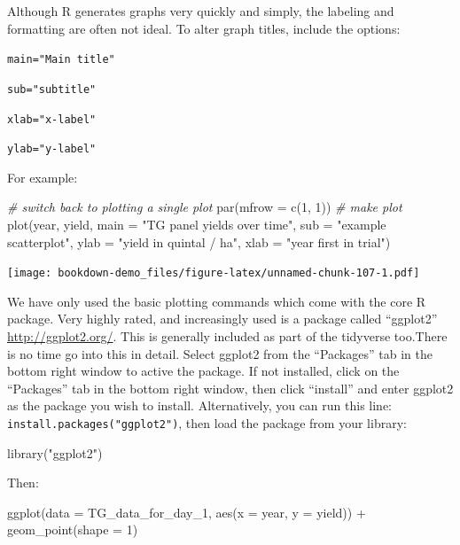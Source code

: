 \documentclass[
]{book}
\newenvironment{Shaded}{\begin{snugshade}}{\end{snugshade}}
\newcommand{\AttributeTok}[1]{\textcolor[rgb]{0.77,0.63,0.00}{#1}}
\newcommand{\CommentTok}[1]{\textcolor[rgb]{0.56,0.35,0.01}{\textit{#1}}}
\newcommand{\DecValTok}[1]{\textcolor[rgb]{0.00,0.00,0.81}{#1}}
\newcommand{\FunctionTok}[1]{\textcolor[rgb]{0.00,0.00,0.00}{#1}}
\newcommand{\NormalTok}[1]{#1}
\newcommand{\SpecialCharTok}[1]{\textcolor[rgb]{0.00,0.00,0.00}{#1}}
\newcommand{\StringTok}[1]{\textcolor[rgb]{0.31,0.60,0.02}{#1}}
\begin{document}
Although R generates graphs very quickly and simply, the labeling and formatting are often not ideal. To alter graph titles, include the options:

\texttt{main="Main\ title"}

\texttt{sub="subtitle"}

\texttt{xlab="x-label"}

\texttt{ylab="y-label"}

For example:

\begin{Shaded}
\begin{Highlighting}[]
\CommentTok{\# switch back to plotting a single plot}
\FunctionTok{par}\NormalTok{(}\AttributeTok{mfrow =} \FunctionTok{c}\NormalTok{(}\DecValTok{1}\NormalTok{, }\DecValTok{1}\NormalTok{))}
\CommentTok{\# make plot}
\FunctionTok{plot}\NormalTok{(year, yield, }\AttributeTok{main =} \StringTok{"TG panel yields over time"}\NormalTok{, }\AttributeTok{sub =} \StringTok{"example scatterplot"}\NormalTok{, }
    \AttributeTok{ylab =} \StringTok{"yield in quintal / ha"}\NormalTok{, }\AttributeTok{xlab =} \StringTok{"year first in trial"}\NormalTok{)}
\end{Highlighting}
\end{Shaded}

\texttt{[image: bookdown-demo\_files/figure-latex/unnamed-chunk-107-1.pdf]}

We have only used the basic plotting commands which come with the core R package. Very highly rated, and increasingly used is a package called ``ggplot2'' \url{http://ggplot2.org/}. This is generally included as part of the tidyverse too.There is no time go into this in detail. Select ggplot2 from the ``Packages'' tab in the bottom right window to active the package. If not installed, click on the ``Packages'' tab in the bottom right window, then click ``install'' and enter ggplot2 as the package you wish to install. Alternatively, you can run this line: \texttt{install.packages("ggplot2")}, then load the package from your library:

\begin{Shaded}
\begin{Highlighting}[]
\FunctionTok{library}\NormalTok{(}\StringTok{"ggplot2"}\NormalTok{)}
\end{Highlighting}
\end{Shaded}

Then:

\begin{Shaded}
\begin{Highlighting}[]
\FunctionTok{ggplot}\NormalTok{(}\AttributeTok{data =}\NormalTok{ TG\_data\_for\_day\_1, }\FunctionTok{aes}\NormalTok{(}\AttributeTok{x =}\NormalTok{ year, }\AttributeTok{y =}\NormalTok{ yield)) }\SpecialCharTok{+} 
    \FunctionTok{geom\_point}\NormalTok{(}\AttributeTok{shape =} \DecValTok{1}\NormalTok{)}
\end{Highlighting}
\end{Shaded}
\end{document}
